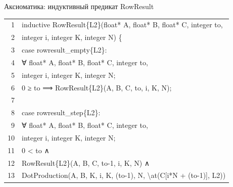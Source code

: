 \documentclass[aspectratio=169, 11pt]{beamer}
\newcommand{\AK}[1]{\textcolor{acslkw}{#1}}   %
\newcommand{\AT}[1]{\textcolor{acslty}{#1}}   %
\newcommand{\AQ}[1]{\textcolor{acslqu}{#1}}   %
\newcommand{\AI}[1]{\textcolor{acslid}{#1}}   %
\newcommand{\AN}[1]{\textcolor{acslnm}{#1}}   %
\newcommand{\AL}[1]{\textcolor{acsllg}{#1}}   %
\newcommand{\ALB}[1]{\textcolor{acsllb}{#1}}  %
\begin{document}
\begin{frame}[fragile]{Аксиоматика: индуктивный предикат RowResult}
	\begingroup
	\setlength{\fboxsep}{0pt}%
	\colorbox{codebg}{%
		\begin{minipage}{\linewidth}
			\vspace{6pt}%
			\hspace{8pt}%
			\begin{tabular}{@{}r@{\hspace{1.2em}}l@{}}
				\textcolor{ln}{1} & \AK{inductive} \AI{RowResult}\{\ALB{L2}\}(\AT{float*} \AI{A}, \AT{float*} \AI{B}, \AT{float*} \AI{C}, \AT{integer} \AI{to}, \\
				\textcolor{ln}{2} & \hspace{2em}\AT{integer} \AI{i}, \AT{integer} \AI{K}, \AT{integer} \AI{N}) \{ \\
				\textcolor{ln}{3} & \hspace{2em}\AK{case} \AI{rowresult\_empty}\{\ALB{L2}\}: \\
				\textcolor{ln}{4} & \hspace{4em}\AQ{∀} \AT{float*} \AI{A}, \AT{float*} \AI{B}, \AT{float*} \AI{C}, \AT{integer} \AI{to}, \\
				\textcolor{ln}{5} & \hspace{4em}\AT{integer} \AI{i}, \AT{integer} \AI{K}, \AT{integer} \AI{N}; \\
				\textcolor{ln}{6} & \hspace{4em}\AN{0} \AL{≥} \AI{to} \AL{⟹} \AI{RowResult}\{\ALB{L2}\}(\AI{A}, \AI{B}, \AI{C}, \AI{to}, \AI{i}, \AI{K}, \AI{N}); \\
				\textcolor{ln}{7} & \\
				\textcolor{ln}{8} & \hspace{2em}\AK{case} \AI{rowresult\_step}\{\ALB{L2}\}: \\
				\textcolor{ln}{9} & \hspace{4em}\AQ{∀} \AT{float*} \AI{A}, \AT{float*} \AI{B}, \AT{float*} \AI{C}, \AT{integer} \AI{to}, \\
				\textcolor{ln}{10} & \hspace{4em}\AT{integer} \AI{i}, \AT{integer} \AI{K}, \AT{integer} \AI{N}; \\
				\textcolor{ln}{11} & \hspace{4em}\AN{0} \AL{<} \AI{to} \AL{∧} \\
				\textcolor{ln}{12} & \hspace{4em}\AI{RowResult}\{\ALB{L2}\}(\AI{A}, \AI{B}, \AI{C}, \AI{to}\AN{-1}, \AI{i}, \AI{K}, \AI{N}) \AL{∧} \\
				\textcolor{ln}{13} & \hspace{4em}\AI{DotProduction}(\AI{A}, \AI{B}, \AI{K}, \AI{i}, \AI{K}, (\AI{to}\AN{-1}), \AI{N}, \AI{\textbackslash at}(\AI{C}[\AI{i}\AI{*}\AI{N} \AL{+} (\AI{to}\AN{-1})], \ALB{L2})) \\

\end{tabular}
\end{minipage}}
\end{frame}
\end{document}
